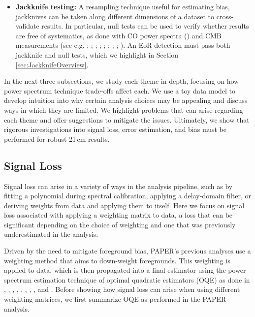 \documentclass[preprint2,numberedappendix,tighten]{aastex6}  %
\begin{document}
\begin{itemize}
\item \textbf{Jackknife testing:} A resampling technique useful for estimating bias, jackknives can be taken along different 
dimensions of a dataset to cross-validate results. In particular, null tests can be used to verify whether results are free of 
systematics, as done with CO power spectra (\citealt{keating_et_al2016}) and CMB measurements (see e.g. \citealt{ade_et_al2008}; \citealt{chiang_et_al2010}; \citealt{bischoff_et_al2011}; \citealt{das_et_al2011b}; \citealt{araujo_et_al2012}; \citealt{crites_et_al2015}; \citealt{ade_et_al2016}; \citealt{ade_et_al2017}; \citealt{sherwin_et_al2017}). An EoR detection must pass both jackknife and null tests, which we highlight in Section \ref{sec:JackknifeOverview}.
\end{itemize}

In the next three subsections, we study each theme in depth, focusing on how power spectrum technique trade-offs affect each. 
We use a toy data model to develop intuition into why certain analysis choices may be appealing and discuss ways in which 
they are limited. We highlight problems that can arise regarding each theme and offer suggestions to mitigate the issues. 
Ultimately, we show that rigorous investigations into signal loss, error estimation, and bias must be performed for robust 21\,cm results.


\subsection{Signal Loss}
\label{sec:SiglossOverview}

Signal loss can arise in a variety of ways in the analysis pipeline, such as by fitting a polynomial during 
spectral calibration, applying a delay-domain filter, or deriving weights from data and applying them to itself. Here we focus on signal loss associated with 
applying a weighting matrix to data, a loss that can be significant depending on the choice of weighting and one that was 
previously underestimated in the  analysis.

Driven by the need to mitigate foreground bias, PAPER's previous analyses use a weighting method that aims to down-weight 
foregrounds. This weighting is applied to data, which is then propagated into a final estimator using the power spectrum 
estimation technique of optimal quadratic estimators (OQE) as done in \citet{liu_tegmark2011}, \citet{dillon_et_al2013a}, \citet{liu_et_al2014a}, \citet{liu_et_al2014b}, \citet{trott_et_al2012}, \citet{dillon_et_al2014}, \citet{dillon_et_al2015}, \citet{switzer_et_al2015}, and \citet{trott_et_al2016}. Before showing 
how signal loss can arise when using different weighting matrices, we first summarize OQE as performed in the PAPER 
analysis.
\end{document}

